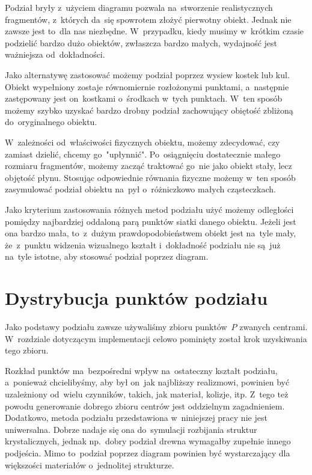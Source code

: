 \documentclass[skorowidz,autorrok,backref,xodstep,oswiadczenie]{wmimgr}
\begin{document}
Podział bryły z~użyciem diagramu pozwala na~stworzenie realistycznych fragmentów, z~których da~się spowrotem złożyć pierwotny obiekt. Jednak nie zawsze jest to~dla nas niezbędne. W~przypadku, kiedy musimy w~krótkim czasie podzielić bardzo dużo obiektów, zwłaszcza bardzo małych, wydajność jest ważniejsza od~dokładności.

Jako alternatywę zastosować możemy podział poprzez wysiew kostek lub kul. Obiekt wypełniony zostaje równomiernie rozłożonymi punktami, a~następnie zastępowany jest on~kostkami o~środkach w~tych punktach. W~ten sposób możemy szybko uzyskać bardzo drobny podział zachowujący obiętość zbliżoną do~oryginalnego obiektu.

W~zależności od~właściwości fizycznych obiektu, możemy zdecydować, czy zamiast dzielić, chcemy go~"upłynnić". Po~osiągnięciu dostatecznie małego rozmiaru fragmentów, możemy zacząć traktować go~nie jako obiekt stały, lecz objętość płynu. Stosując odpowiednie równania fizyczne możemy w~ten sposób zasymulować podział obiektu na~pył o~różniczkowo małych cząsteczkach.

Jako kryterium zastosowania różnych metod podziału użyć możemy odległości pomiędzy najbardziej oddaloną parą punktów siatki danego obiektu. Jeżeli jest ona bardzo mała, to~z~dużym prawdopodobieństwem obiekt jest na~tyle mały, że~z~punktu widzenia wizualnego kształt i~dokładność podziału nie są~już na~tyle istotne, aby stosować podział poprzez diagram.

\section{Dystrybucja punktów podziału}

Jako podstawy podziału zawsze używaliśmy zbioru punktów~$P$ zwanych centrami. W~rozdziale dotyczącym implementacji celowo pominięty został krok uzyskiwania tego zbioru.

Rozkład punktów ma~bezpośredni wpływ na~ostateczny kształt podziału, a~ponieważ chcielibyśmy, aby był on~jak najbliższy realizmowi, powinien być uzależniony od~wielu czynników, takich, jak materiał, kolizje, itp. Z~tego też powodu generowanie dobrego zbioru centrów jest oddzielnym zagadnieniem. Dodatkowo, metoda podziału przedstawiona w~niniejszej pracy nie jest uniwersalna. Dobrze nadaje się ona do~symulacji rozbijania struktur krystalicznych, jednak np.~dobry podział drewna wymagałby zupełnie innego podjeścia. Mimo to~podział poprzez diagram powinien być wystarczający dla większości materiałów o~jednolitej strukturze.
\end{document}
